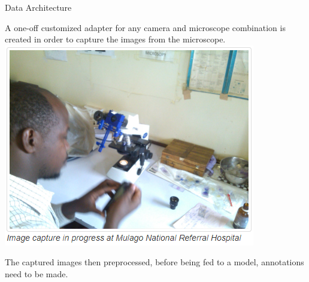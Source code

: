 \documentclass{beamer}
\begin{document}
\begin{frame}[t]{Data Architecture}
	\begin{block}{}\vspace{2pt}\small
	A one-off customized adapter for any camera and microscope combination is created in order to capture the images from the microscope.\\
	 
	\includegraphics[scale = 0.4]{im_cap.png}
	
	The captured images then preprocessed, before being fed to a model, annotations need to be made. 
\end{block}
\end{frame}
\end{document}
